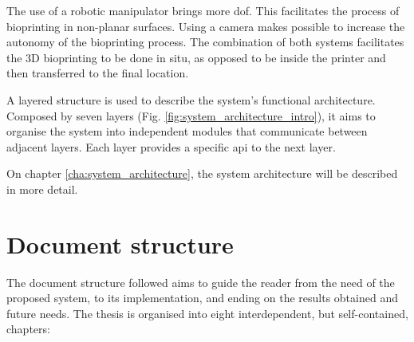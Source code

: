 The use of a robotic manipulator brings more \gls{dof}. This facilitates the process of bioprinting in non-planar surfaces. Using a camera makes possible to increase the autonomy of the bioprinting process. The combination of both systems facilitates the 3D bioprinting to be done in situ, as opposed to be inside the printer and then transferred to the final location.

A layered structure is used to describe the system's functional architecture. Composed by seven layers (Fig. \ref{fig:system_architecture_intro}), it aims to organise the system into independent modules that communicate between adjacent layers. Each layer provides a specific \gls{api} to the next layer.

On chapter \ref{cha:system_architecture}, the system architecture will be described in more detail.


\section{Document structure}
\label{sec:document_structure}

The document structure followed aims to guide the reader from the need of the proposed system, to its implementation, and ending on the results obtained and future needs. The thesis is organised into eight interdependent, but self-contained, chapters:

